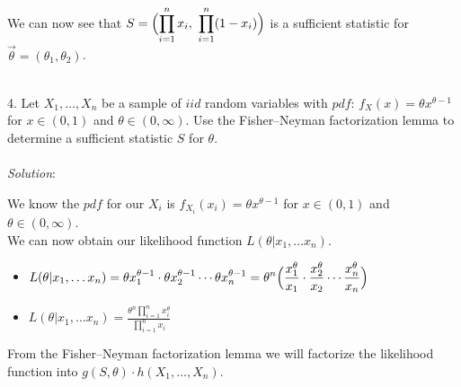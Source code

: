 \documentclass[12pt]{article}
\newcommand{\XB}{\color{black}}
\newcommand{\XBB}{\color{blue}}
\newcommand{\XV}{\color{violet}}
\begin{document}
\noindent
We can now see that $ \displaystyle S = \Bigl( \prod_{i=1}^{n} x_{i} , \ \prod_{i=1}^{n} (1 - x_{i}) \Bigr) $ is a sufficient statistic for $ \overrightarrow{\theta} = (\theta_{1}, \theta_{2}) $.

\newpage
\XBB\hrulefill\XB \\

4. Let $ X_{1},\dots,X_{n} $ be a sample of $ iid $ random variables with $ pdf $: $ f_{X}(x) = \theta x^{\theta - 1} $ for $ x \in (0, 1) $ and $ \theta \in (0, \infty) $.
Use the Fisher–Neyman factorization lemma to determine a sufficient statistic $ S $ for $ \theta $. \\

\XBB\hrulefill\XB 
\vspace{5mm} \\


\textit{Solution}:
\vspace{2.5mm}

\noindent 
We know the $ pdf $ for our $ \displaystyle X_{i} $ is $ \displaystyle f_{X_{i}}(x_{i}) = \theta x^{\theta - 1} $ for $ x \in (0, 1) $ and $ \theta \in (0, \infty) $. \\

We can now obtain our likelihood function $ L(\theta | x_{1}, \dots x_{n}) $. \\
\begin{itemize}
    \item $ \displaystyle L(\theta | x_{1}, \dots x_{n}) = \theta x_{1}^{\theta - 1} \cdot \theta x_{2}^{\theta - 1} \cdots \theta x_{n}^{\theta - 1} = \theta^{n} \Bigl( \frac{x_{1}^{\theta}}{x_{1}} \cdot \frac{x_{2}^{\theta}}{x_{2}} \cdots \frac{x_{n}^{\theta}}{x_{n}} \Bigr) $
    \item $ \displaystyle L(\theta | x_{1}, \dots x_{n}) = \frac{ \theta^{n} \prod_{i=1}^{n} x_{i}^{\theta} }{ \prod_{i=1}^{n} x_{i} } $
\end{itemize}

\noindent
From the Fisher–Neyman factorization lemma we will factorize the likelihood function into $ g(S, \theta) \cdot h(X_{1}, \dots , X_{n}) $. \\
\end{document}
